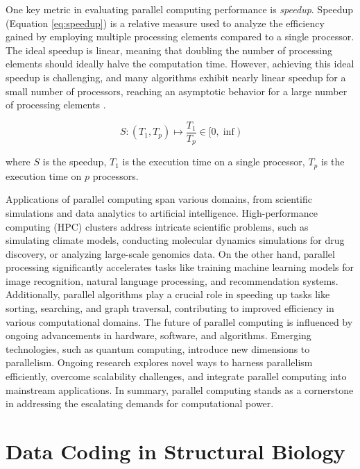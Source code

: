 \documentclass[Ingles]{phdthesis}
\begin{document}
One key metric in evaluating parallel computing performance is \textit{speedup}. Speedup (Equation \ref{eq:speedup}) is a relative measure used to analyze the efficiency gained by employing multiple processing elements compared to a single processor. The ideal speedup is linear, meaning that doubling the number of processing elements should ideally halve the computation time. However, achieving this ideal speedup is challenging, and many algorithms exhibit nearly linear speedup for a small number of processors, reaching an asymptotic behavior for a large number of processing elements \cite{grama2003,matloff2012}.

\begin{equation}
  S \colon (T_1, T_p) \mapsto \frac{T_1}{T_p} \in [0,\inf)
  \label{eq:speedup}
\end{equation}

\noindent where \(S\) is the speedup, \(T_1\) is the execution time on a single processor, \(T_p\) is the execution time on \(p\) processors.

Applications of parallel computing span various domains, from scientific simulations and data analytics to artificial intelligence. High-performance computing (HPC) clusters address intricate scientific problems, such as simulating climate models, conducting molecular dynamics simulations for drug discovery, or analyzing large-scale genomics data. On the other hand, parallel processing significantly accelerates tasks like training machine learning models for image recognition, natural language processing, and recommendation systems. Additionally, parallel algorithms play a crucial role in speeding up tasks like sorting, searching, and graph traversal, contributing to improved efficiency in various computational domains. The future of parallel computing is influenced by ongoing advancements in hardware, software, and algorithms. Emerging technologies, such as quantum computing, introduce new dimensions to parallelism. Ongoing research explores novel ways to harness parallelism efficiently, overcome scalability challenges, and integrate parallel computing into mainstream applications. In summary, parallel computing stands as a cornerstone in addressing the escalating demands for computational power.


\chapter{Data Coding in Structural Biology}
\end{document}
